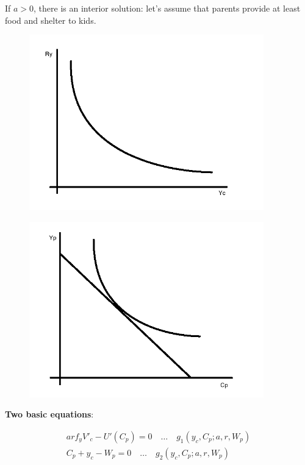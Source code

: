 \documentclass[14pt,notitlepage]{article}
\begin{document}
If $a > 0$, there is an interior solution: let's assume that parents provide at least food and shelter to kids.

\begin{center}
\begin{figure}[H] 
\caption{}
\centering
\includegraphics[width=4in, height=3in]{plot2a.png}
\end{figure}
\end{center}

\begin{center}
\begin{figure}[H] 
\caption{}
\centering
\includegraphics[width=4in, height=3in]{plot2b.png}
\end{figure}
\end{center}

\textbf{Two basic equations}:

\begin{align*}
a r f_y V'_{c} - U'(C_p) = 0 \quad \ldots \quad g_1 (y_c, C_p; a, r, W_p) \\
C_p + y_c - W_p = 0 \quad \ldots \quad g_2 (y_c, C_p; a, r, W_p)
\end{align*}
\end{document}
